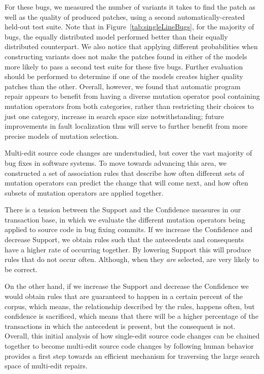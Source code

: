 \documentclass[conference]{IEEEtran}
\begin{document}
For these bugs, we measured the number of variants it takes to find the 
patch as well as the quality of produced patches, using a second 
automatically-created held-out test suite.
Note that in Figure~\ref{tab:singleLineBugs}, for the majority of bugs, the 
equally distributed model performed better than their equally distributed 
counterpart.
We also notice that applying different probabilities when constructing variants
does not make the patches found in either of the models more likely to pass a
second test suite for these five bugs. Further evaluation should be performed to
determine if one of the models creates higher quality patches than the other. 
Overall, however, we found that automatic program repair appears to benefit
from having a diverse mutation operator pool containing mutation operators from 
both categories,
rather than restricting their choices to just one category, increase in search
space size notwithstanding; future improvements in fault localization thus will
serve to further benefit from more precise models of mutation selection. 

Multi-edit source code changes are understudied, but cover
the vast majority of bug fixes in software systems. 
To move towards advancing this area, we constructed a set of association rules 
that describe 
how often different sets of mutation operators can predict the change that will 
come next, and how often subsets of mutation operators are applied together.

There is a tension between the Support and the Confidence measures in our 
transaction 
base, in which we 
evaluate the different mutation operators being applied to source code in bug 
fixing commits. 
If we increase the Confidence and decrease Support, we obtain rules such that
the antecedents and consequents have a higher rate of occurring together. By 
lowering Support this will produce rules that
do not occur often.  Although, when they \emph{are} selected, are very likely to 
be
correct. 

On the other hand, if 
we increase the Support and decrease the Confidence we would obtain rules that 
are guaranteed to happen in a certain percent of the corpus, which means,
the relationship described by the rules, happens often, but confidence is 
sacrificed, which means that there will be a higher percentage of the 
transactions in which the antecedent is present, but the consequent is not. 
Overall, this initial analysis of how single-edit source code changes can be 
chained together 
to become multi-edit source code changes by following human behavior provides a
first step towards an efficient mechanism for traversing the large search space
of multi-edit repairs.
\end{document}
